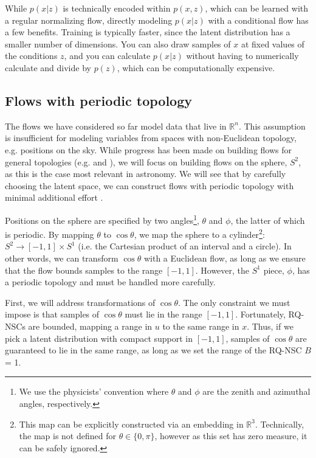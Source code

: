 \documentclass[twocolumn,twocolappendix]{aastex631}
\newcommand{\R}{\mathbb{R}}
\begin{document}
While $p(x|z)$ is technically encoded within $p(x,z)$, which can be learned with a regular normalizing flow, directly modeling $p(x|z)$ with a conditional flow has a few benefits.
Training is typically faster, since the latent distribution has a smaller number of dimensions.
You can also draw samples of $x$ at fixed values of the conditions $z$, and you can calculate $p(x|z)$ without having to numerically calculate and divide by $p(z)$, which can be computationally expensive.

\subsection{Flows with periodic topology}
\label{sec:periodic}

The flows we have considered so far model data that live in $\R^n$.
This assumption is insufficient for modeling variables from spaces with non-Euclidean topology, e.g. positions on the sky.
While progress has been made on building flows for general topologies (e.g. \citealt{gemici2016} and \citealt{falorsi2019}), we will focus on building flows on the sphere, $S^2$, as this is the case most relevant in astronomy.
We will see that by carefully choosing the latent space, we can construct flows with periodic topology with minimal additional effort \citep{rezende2020}.

Positions on the sphere are specified by two angles\footnote{
We use the physicists' convention where $\theta$ and $\phi$ are the zenith and azimuthal angles, respectively.
},
$\theta$ and $\phi$, the latter of which is periodic.
By mapping $\theta$ to $\cos\theta$, we map the sphere to a cylinder\footnote{
This map can be explicitly constructed via an embedding in $\R^3$.
Technically, the map is not defined for $\theta \in \{0, \pi\}$, however as this set has zero measure, it can be safely ignored.}:
$S^2 \to [-1,1] \times S^1$ (i.e. the Cartesian product of an interval and a circle).
In other words, we can transform $\cos\theta$ with a Euclidean flow, as long as we ensure that the flow bounds samples to the range $[-1, 1]$.
However, the $S^1$ piece, $\phi$, has a periodic topology and must be handled more carefully.

First, we will address transformations of $\cos\theta$.
The only constraint we must impose is that samples of $\cos\theta$ must lie in the range $[-1, 1]$.
Fortunately, RQ-NSCs are bounded, mapping a range in $u$ to the same range in $x$.
Thus, if we pick a latent distribution with compact support in $[-1, 1]$, samples of $\cos\theta$ are guaranteed to lie in the same range, as long as we set the range of the RQ-NSC $B$ = 1.
\end{document}
